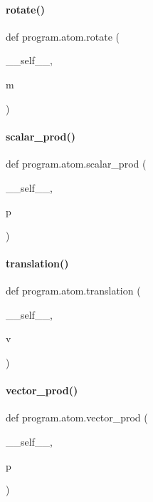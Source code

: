 \mbox{\label{classprogram_1_1atom_a9b68760818cd15c7231caeafcc36b841}} 
\paragraph{rotate()}
{\footnotesize\ttfamily def program.\+atom.\+rotate (\begin{DoxyParamCaption}\item[{}]{\+\_\+\+\_\+self\+\_\+\+\_\+,  }\item[{}]{m }\end{DoxyParamCaption})}

\mbox{\label{classprogram_1_1atom_a1863fcbd5815b422685226941933bf58}} 
\paragraph{scalar\+\_\+prod()}
{\footnotesize\ttfamily def program.\+atom.\+scalar\+\_\+prod (\begin{DoxyParamCaption}\item[{}]{\+\_\+\+\_\+self\+\_\+\+\_\+,  }\item[{}]{p }\end{DoxyParamCaption})}

\mbox{\label{classprogram_1_1atom_ab8c1cb9e73897ef7413e183a9986f744}} 
\paragraph{translation()}
{\footnotesize\ttfamily def program.\+atom.\+translation (\begin{DoxyParamCaption}\item[{}]{\+\_\+\+\_\+self\+\_\+\+\_\+,  }\item[{}]{v }\end{DoxyParamCaption})}

\mbox{\label{classprogram_1_1atom_ae8937a9e9eb716fe83cac0b0cd302a05}} 
\paragraph{vector\+\_\+prod()}
{\footnotesize\ttfamily def program.\+atom.\+vector\+\_\+prod (\begin{DoxyParamCaption}\item[{}]{\+\_\+\+\_\+self\+\_\+\+\_\+,  }\item[{}]{p }\end{DoxyParamCaption})}



